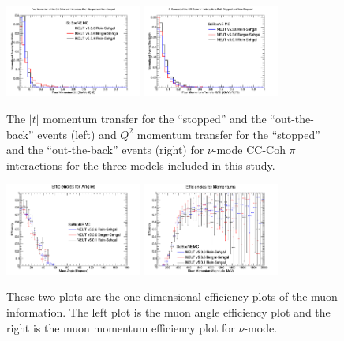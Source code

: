 \documentclass[11pt]{article}
\begin{document}
\begin{figure}[H]
\centering
\includegraphics[width=0.4\textwidth]{CCCohPlots/NMCCCohGoodT.png}
\includegraphics[width=0.4\textwidth]{CCCohPlots/NMCCCohGoodQ2.png}
\caption{The $|t|$ momentum transfer for the ``stopped'' and the ``out-the-back'' events (left) and $Q^2$ momentum transfer for the ``stopped'' and the ``out-the-back'' events (right) for $\nu$-mode CC-Coh $\pi$ interactions for the three models included in this study.} 
\label{fig:NuModeCCCohGoodTAndQ2}
\end{figure}





\begin{figure}[H]
\centering
\includegraphics[width=0.4\textwidth]{NMCombinedPlotsImages/24-NMCombinedPlots.png}
\includegraphics[width=0.4\textwidth]{NMCombinedPlotsImages/25-NMCombinedPlots.png}
\caption{These two plots are the one-dimensional efficiency plots of the muon information. The left plot is the muon angle efficiency plot and the right is the muon momentum efficiency plot for $\nu$-mode.}
\label{fig:MomAngEffNM}
\end{figure}
\end{document}
